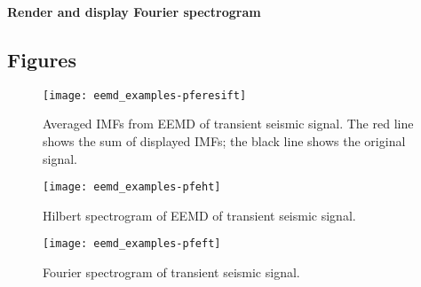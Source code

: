 \documentclass[12pt]{article}
\begin{document}
\textbf{Render and display Fourier spectrogram}

\begin{Schunk}
\end{Schunk}

\subsection{Figures}

\FloatBarrier

\begin{figure}[ht]
\begin{center}
\texttt{[image: eemd\_examples-pferesift]}
\end{center}
\caption{Averaged IMFs from EEMD of transient seismic signal.
The red line shows the sum of displayed IMFs; the black line shows the original signal.}
\label{fig:pferesift}
\end{figure}

\begin{figure}[ht]
\begin{center}
\texttt{[image: eemd\_examples-pfeht]}
\end{center}
\caption{Hilbert spectrogram of EEMD of transient seismic signal.}
\label{fig:pfeht}
\end{figure}

\begin{figure}[ht]
\begin{center}
\texttt{[image: eemd\_examples-pfeft]}
\end{center}
\caption{Fourier spectrogram of transient seismic signal.}
\label{fig:pfeft}
\end{figure}
\end{document}
